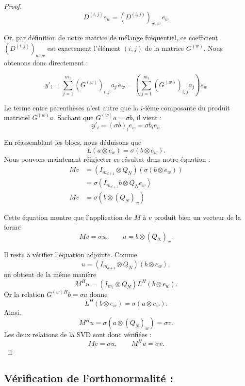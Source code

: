 \begin{proof}
$$D^{(i,j)} e_w = (D^{(i,j)})_{w,w} \, e_w$$

Or, par définition de notre matrice de mélange fréquentiel, ce coefficient $(D^{(i,j)})_{w,w}$ est 
exactement l'élément $(i,j)$ de la matrice $G^{(w)}$. Nous obtenons donc directement :

$$y'_i = \sum_{j=1}^{m_1} (G^{(w)})_{i,j} \, a_j \, e_w = \left( \sum_{j=1}^{m_1} (G^{(w)})_{i,j} a_j \right) e_w$$

Le terme entre parenthèses n'est autre que la $i$-ième composante du produit matriciel $G^{(w)} a$. 
Sachant que $G^{(w)} a = \sigma b$, il vient :
\[
y'_i = (\sigma b)_i e_w = \sigma b_i e_w
\]

En réassemblant les blocs, nous déduisons que 
\begin{equation}
L(a \otimes e_w) = \sigma(b \otimes e_w).
\end{equation}
Nous pouvons maintenant réinjecter ce résultat dans notre équation :
\begin{align*}
M v &= (I_{m_{d+1}} \otimes Q_N) \left( \sigma (b \otimes e_w) \right) \\
&= \sigma \left( I_{m_{d+1}} b \otimes Q_N e_w \right) \\
M v &= \sigma \left( b \otimes (Q_N)_w \right)
\end{align*}

Cette équation montre que l'application de $M$ à $v$ produit bien un vecteur de la forme
\[
    Mv=\sigma u,
    \qquad
    u=b\otimes (Q_N)_w.
\]

Il reste à vérifier l'équation adjointe. Comme
\[
    u=(I_{m_{d+1}}\otimes Q_N)(b\otimes e_w),
\]
on obtient de la même manière
\[
    M^H u
    =
    (I_{m_1}\otimes Q_N)L^H(b\otimes e_w).
\]
Or la relation $G^{(w)H}b=\sigma a$ donne
\[
    L^H(b\otimes e_w)=\sigma(a\otimes e_w).
\]
Ainsi,
\[
    M^Hu
    =
    \sigma(a\otimes (Q_N)_w)
    =
    \sigma v.
\]
Les deux relations de la SVD sont donc vérifiées :
\[
    Mv=\sigma u,
    \qquad
    M^Hu=\sigma v.
\]

\end{proof}

\subsection{Vérification de l'orthonormalité :}

